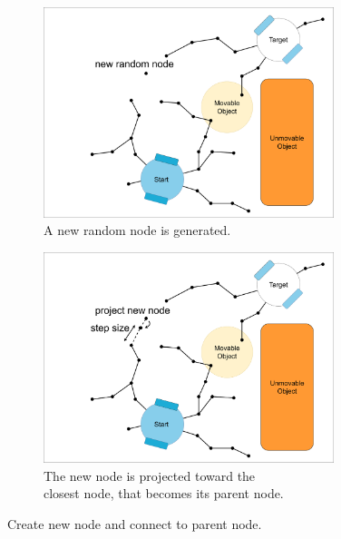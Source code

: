 \begin{figure}[H]
    \centering
    \begin{subfigure}{.49\textwidth}
    \centering
    \includegraphics[width=0.93\textwidth, cfbox=my_light_blue 5pt 0pt]{figures/required_background/mp/2mp_new_rand_sample.drawio.png}
    \caption{A new random node is generated.\newline\newline}
    \end{subfigure}
    \begin{subfigure}{.49\textwidth}
    \centering
    \includegraphics[width=0.93\textwidth, cfbox=my_light_blue 5pt 0pt]{figures/required_background/mp/3mp_project_sample.drawio.png}
    \caption{The new node is projected toward the\\closest node, that becomes its parent node.\bs}%
    \label{subfig:mp_step_size}
    \end{subfigure}

    \caption{Create new node and connect to parent node.}
    \label{fig:motion_planner_adding_one_node_one}
\end{figure}


